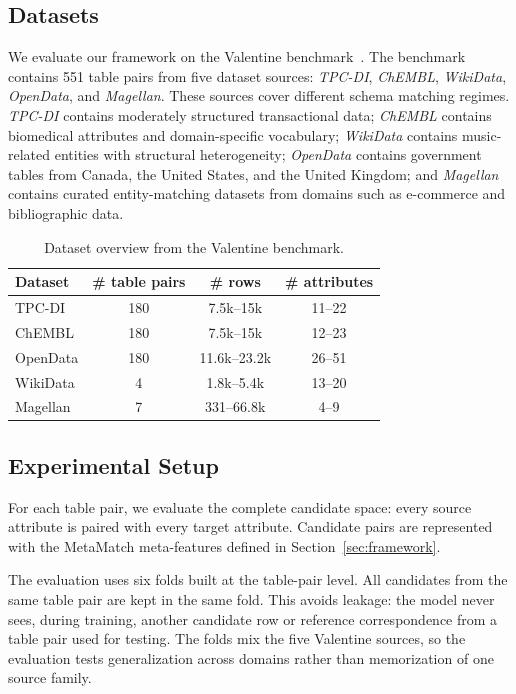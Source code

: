 \documentclass[sigconf, nonacm]{acmart}
\begin{document}
\subsection{Datasets}

We evaluate our framework on the Valentine benchmark~\cite{delft2021valentine}. The benchmark contains 551 table pairs from five dataset sources: \textit{TPC-DI}, \textit{ChEMBL}, \textit{WikiData}, \textit{OpenData}, and \textit{Magellan}. These sources cover different schema matching regimes. \textit{TPC-DI} contains moderately structured transactional data; \textit{ChEMBL} contains biomedical attributes and domain-specific vocabulary; \textit{WikiData} contains music-related entities with structural heterogeneity; \textit{OpenData} contains government tables from Canada, the United States, and the United Kingdom; and \textit{Magellan} contains curated entity-matching datasets from domains such as e-commerce and bibliographic data.

\begin{table}[!t]
\centering
\caption{Dataset overview from the Valentine benchmark.}
\label{tab:dataset_characteristics}
\begin{tabular}{lccc}
\toprule
\textbf{Dataset} & \textbf{\# table pairs} & \textbf{\# rows} & \textbf{\# attributes} \\
\midrule
TPC-DI & 180 & 7.5k--15k & 11--22 \\
ChEMBL & 180 & 7.5k--15k & 12--23 \\
OpenData & 180 & 11.6k--23.2k & 26--51 \\
WikiData & 4 & 1.8k--5.4k & 13--20 \\
Magellan & 7 & 331--66.8k & 4--9 \\
\bottomrule
\end{tabular}
\end{table}

\subsection{Experimental Setup}

For each table pair, we evaluate the complete candidate space: every source attribute is paired with every target attribute. Candidate pairs are represented with the MetaMatch meta-features defined in Section~\ref{sec:framework}.

The evaluation uses six folds built at the table-pair level. All candidates from the same table pair are kept in the same fold. This avoids leakage: the model never sees, during training, another candidate row or reference correspondence from a table pair used for testing. The folds mix the five Valentine sources, so the evaluation tests generalization across domains rather than memorization of one source family.
\end{document}
